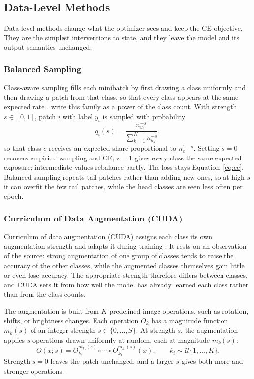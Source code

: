 \documentclass[11pt]{article}
\begin{document}
\subsection{Data-Level Methods}
Data-level methods change what the optimizer sees and keep the CE objective. They are the simplest interventions to state, and they leave the model and its output semantics unchanged.

\subsubsection{Balanced Sampling}
Class-aware sampling fills each minibatch by first drawing a class uniformly and then drawing a patch from that class, so that every class appears at the same expected rate \citep{shen2016relayBackpropagation}. \citet{kang2020decouplingRepresentation} write this family as a power of the class count. With strength $s\in[0,1]$, patch $i$ with label $y_i$ is sampled with probability
\begin{equation}
  q_i(s)=\frac{n_{y_i}^{-s}}{\sum_{k=1}^{N}n_{y_k}^{-s}},
  \label{eq:balanced-sampling}
\end{equation}
\noindent so that class $c$ receives an expected share proportional to $n_c^{1-s}$. Setting $s=0$ recovers empirical sampling and CE; $s=1$ gives every class the same expected exposure; intermediate values rebalance partly. The loss stays Equation~\eqref{eq:ce}. Balanced sampling repeats tail patches rather than adding new ones, so at high $s$ it can overfit the few tail patches, while the head classes are seen less often per epoch.

\subsubsection{Curriculum of Data Augmentation (CUDA)}
Curriculum of data augmentation (CUDA) assigns each class its own augmentation strength and adapts it during training \citep{ahn2023cuda}. It rests on an observation of the source: strong augmentation of one group of classes tends to raise the accuracy of the other classes, while the augmented classes themselves gain little or even lose accuracy. The appropriate strength therefore differs between classes, and CUDA sets it from how well the model has already learned each class rather than from the class counts.

The augmentation is built from $K$ predefined image operations, such as rotation, shifts, or brightness changes. Each operation $O_k$ has a magnitude function $m_k(s)$ of an integer strength $s\in\{0,\ldots,S\}$. At strength $s$, the augmentation applies $s$ operations drawn uniformly at random, each at magnitude $m_k(s)$:
\begin{equation}
  O(x;s)=O_{k_s}^{m_{k_s}(s)}\circ\cdots\circ O_{k_1}^{m_{k_1}(s)}(x),
  \qquad
  k_i\sim\mathcal U\{1,\ldots,K\}.
  \label{eq:cuda-aug}
\end{equation}
\noindent Strength $s=0$ leaves the patch unchanged, and a larger $s$ gives both more and stronger operations.
\end{document}
